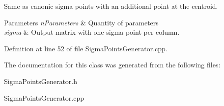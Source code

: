 Same as canonic sigma points with an additional point at the centroid. 
\begin{DoxyParams}{Parameters}
{\em n\+Parameters} & Quantity of parameters \\
\hline
{\em sigma} & Output matrix with one sigma point per column. \\
\hline
\end{DoxyParams}


Definition at line 52 of file Sigma\+Points\+Generator.\+cpp.



The documentation for this class was generated from the following files\+:\begin{DoxyCompactItemize}
\item 
Sigma\+Points\+Generator.\+h\item 
Sigma\+Points\+Generator.\+cpp\end{DoxyCompactItemize}
